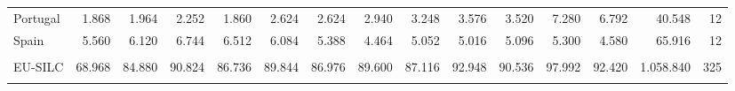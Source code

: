 \begin{tabular}{lrrrrrrrrrrrrrr}
  \hspace{5mm} Portugal & 1.868 & 1.964 & 2.252 & 1.860 & 2.624 & 2.624 & 2.940 & 3.248 & 3.576 & 3.520 & 7.280 & 6.792 & 40.548 &  12 \\ 
  \hspace{5mm} Spain & 5.560 & 6.120 & 6.744 & 6.512 & 6.084 & 5.388 & 4.464 & 5.052 & 5.016 & 5.096 & 5.300 & 4.580 & 65.916 &  12 \\ 
  \multicolumn{14}{l}{\phantom{empty}} \\
  EU-SILC & 68.968 & 84.880 & 90.824 & 86.736 & 89.844 & 86.976 & 89.600 & 87.116 & 92.948 & 90.536 & 97.992 & 92.420 & 1.058.840 & 325 \\ 
   \hline\hline \\[-1.8ex] 
\end{tabular}
